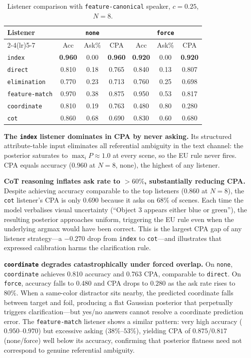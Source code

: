 \begin{table}[t]
\centering
\small
\label{tab:listener-comparison}
\setlength{\tabcolsep}{5pt}
\begin{tabular}{lcccccc}
\toprule
\multirow{2}{*}{Listener} &
\multicolumn{3}{c}{\texttt{none}} &
\multicolumn{3}{c}{\texttt{force}} \\
\cmidrule(lr){2-4}\cmidrule(lr){5-7}
 & Acc & Ask\% & CPA & Acc & Ask\% & CPA \\
\midrule
\texttt{index}         & \textbf{0.960} & 0.00 & \textbf{0.960} & \textbf{0.920} & 0.00 & \textbf{0.920} \\
\texttt{direct}        & 0.810 & 0.18 & 0.765 & 0.840 & 0.13 & 0.807 \\
\texttt{elimination}   & 0.770 & 0.23 & 0.713 & 0.760 & 0.25 & 0.698 \\
\texttt{feature-match} & 0.970 & 0.38 & 0.875 & 0.950 & 0.53 & 0.817 \\
\texttt{coordinate} & 0.810 & 0.19 & 0.763 & 0.480 & 0.80 & 0.280 \\
\texttt{cot}           & 0.860 & 0.68 & 0.690 & 0.830 & 0.60 & 0.680 \\
\bottomrule
\end{tabular}
\caption{Listener comparison with \texttt{feature-canonical} speaker, $c{=}0.25$, $N{=}8$.}
\end{table}

\textbf{The \texttt{index} listener dominates in CPA by never asking.}
Its structured attribute-table input eliminates all referential ambiguity
in the text channel: the posterior saturates to $\max_i P \approx 1.0$
at every scene, so the EU rule never fires.  CPA equals accuracy ($0.960$
at $N{=}8$, none), the highest of any listener.

\textbf{CoT reasoning inflates ask rate to $>60\%$, substantially reducing CPA.}
Despite achieving accuracy comparable to the top listeners (0.860 at $N{=}8$),
the \texttt{cot} listener's CPA is only 0.690 because it asks on 68\% of scenes.
Each time the model verbalises visual uncertainty (``Object 3 appears either
blue or green''), the resulting posterior approaches uniform, triggering the
EU rule even when the underlying argmax would have been correct.  This is the
largest CPA gap of any listener strategy---a $-0.270$ drop from \texttt{index}
to \texttt{cot}---and illustrates that expressed calibration harms the
clarification rule.

\textbf{\texttt{coordinate} degrades catastrophically under forced overlap.}
On \texttt{none}, \texttt{coordinate} achieves 0.810 accuracy and 0.763 CPA,
comparable to \texttt{direct}.  On \texttt{force}, accuracy falls to 0.480
and CPA drops to $0.280$ as the ask rate rises to 80\%.
When a same-color distractor sits nearby, the predicted coordinate falls
between target and foil, producing a flat Gaussian posterior that perpetually
triggers clarification---but yes/no answers cannot resolve a coordinate
prediction error.  The \texttt{feature-match} listener shows a similar
pattern: very high accuracy ($0.950$--$0.970$) but excessive asking
($38\%$--$53\%$), yielding CPA of $0.875$/$0.817$ (none/force) well below
its accuracy, confirming that posterior flatness need not correspond to
genuine referential ambiguity.

